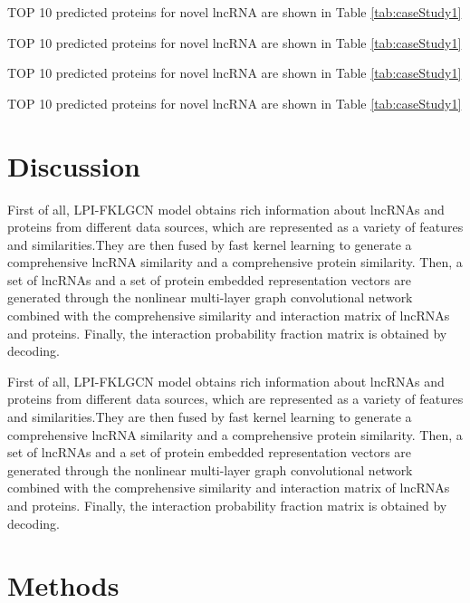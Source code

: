 \documentclass[fleqn,10pt]{wlscirep}
\begin{document}
TOP 10 predicted proteins for novel lncRNA are shown in Table \ref{tab:caseStudy1}

TOP 10 predicted proteins for novel lncRNA are shown in Table \ref{tab:caseStudy1}

TOP 10 predicted proteins for novel lncRNA are shown in Table \ref{tab:caseStudy1}

TOP 10 predicted proteins for novel lncRNA are shown in Table \ref{tab:caseStudy1}

\section*{Discussion}
First of all, LPI-FKLGCN model obtains rich information about lncRNAs and proteins from different data sources, which are represented as a variety of features and similarities.They are then fused by fast kernel learning to generate a comprehensive lncRNA similarity and a comprehensive protein similarity. Then, a set of lncRNAs and a set of protein embedded representation vectors are generated through the nonlinear multi-layer graph convolutional network combined with the comprehensive similarity and interaction matrix of lncRNAs and proteins. Finally, the interaction probability fraction matrix is obtained by decoding.

First of all, LPI-FKLGCN model obtains rich information about lncRNAs and proteins from different data sources, which are represented as a variety of features and similarities.They are then fused by fast kernel learning to generate a comprehensive lncRNA similarity and a comprehensive protein similarity. Then, a set of lncRNAs and a set of protein embedded representation vectors are generated through the nonlinear multi-layer graph convolutional network combined with the comprehensive similarity and interaction matrix of lncRNAs and proteins. Finally, the interaction probability fraction matrix is obtained by decoding.

\section*{Methods}
\end{document}
